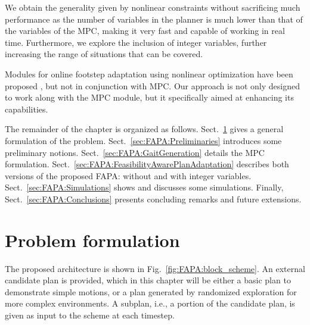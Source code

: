 We obtain the generality given by nonlinear constraints without sacrificing much performance as the number of variables in the planner is much lower than that of the variables of the MPC, making it very fast and capable of working in real time. Furthermore, we explore the inclusion of integer variables, further increasing the range of situations that can be covered.

Modules for online footstep adaptation using nonlinear optimization have been proposed \cite{Ding2019IROS}, but not in conjunction with MPC. Our approach is not only designed to work along with the MPC module, but it specifically aimed at enhancing its capabilities.

The remainder of the chapter is organized as follows. Sect.~\ref{sec:FAPA:ProblemFormulation} gives a general formulation of the problem. Sect.~\ref{sec:FAPA:Preliminaries} introduces some preliminary notions. Sect.~\ref{sec:FAPA:GaitGeneration} details the MPC formulation. Sect.~\ref{sec:FAPA:FeasibilityAwarePlanAdaptation} describes both versions of the proposed FAPA: without and with integer variables. Sect.~\ref{sec:FAPA:Simulations} shows and discusses some simulations. Finally, Sect.~\ref{sec:FAPA:Conclusions} presents concluding remarks and future extensions.

\section{Problem formulation} 
\label{sec:FAPA:ProblemFormulation}



The proposed architecture is shown in Fig.~\ref{fig:FAPA:block_scheme}. An external candidate plan is provided, which in this chapter will be either a basic plan to demonstrate simple motions, or a plan generated by randomized exploration \cite{Cipriano2023RAS} for more complex environments. A subplan, i.e., a portion of the candidate plan, is given as input to the scheme at each timestep.

